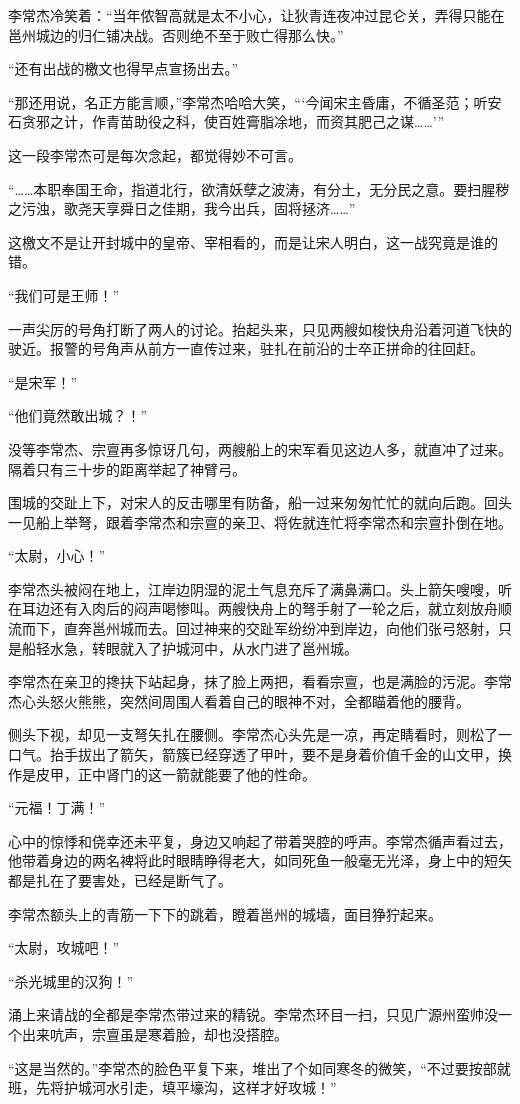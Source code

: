 李常杰冷笑着：“当年侬智高就是太不小心，让狄青连夜冲过昆仑关，弄得只能在邕州城边的归仁铺决战。否则绝不至于败亡得那么快。”

“还有出战的檄文也得早点宣扬出去。”

“那还用说，名正方能言顺，”李常杰哈哈大笑，“‘今闻宋主昏庸，不循圣范；听安石贪邪之计，作青苗助役之科，使百姓膏脂凃地，而资其肥己之谋……’”

这一段李常杰可是每次念起，都觉得妙不可言。

“……本职奉国王命，指道北行，欲清妖孽之波涛，有分土，无分民之意。要扫腥秽之污浊，歌尧天享舜日之佳期，我今出兵，固将拯济……”

这檄文不是让开封城中的皇帝、宰相看的，而是让宋人明白，这一战究竟是谁的错。

“我们可是王师！”

一声尖厉的号角打断了两人的讨论。抬起头来，只见两艘如梭快舟沿着河道飞快的驶近。报警的号角声从前方一直传过来，驻扎在前沿的士卒正拼命的往回赶。

“是宋军！”

“他们竟然敢出城？！”

没等李常杰、宗亶再多惊讶几句，两艘船上的宋军看见这边人多，就直冲了过来。隔着只有三十步的距离举起了神臂弓。

围城的交趾上下，对宋人的反击哪里有防备，船一过来匆匆忙忙的就向后跑。回头一见船上举弩，跟着李常杰和宗亶的亲卫、将佐就连忙将李常杰和宗亶扑倒在地。

“太尉，小心！”

李常杰头被闷在地上，江岸边阴湿的泥土气息充斥了满鼻满口。头上箭矢嗖嗖，听在耳边还有入肉后的闷声喝惨叫。两艘快舟上的弩手射了一轮之后，就立刻放舟顺流而下，直奔邕州城而去。回过神来的交趾军纷纷冲到岸边，向他们张弓怒射，只是船轻水急，转眼就入了护城河中，从水门进了邕州城。

李常杰在亲卫的搀扶下站起身，抹了脸上两把，看看宗亶，也是满脸的污泥。李常杰心头怒火熊熊，突然间周围人看着自己的眼神不对，全都瞄着他的腰背。

侧头下视，却见一支弩矢扎在腰侧。李常杰心头先是一凉，再定睛看时，则松了一口气。抬手拔出了箭矢，箭簇已经穿透了甲叶，要不是身着价值千金的山文甲，换作是皮甲，正中肾门的这一箭就能要了他的性命。

“元福！丁满！”

心中的惊悸和侥幸还未平复，身边又响起了带着哭腔的呼声。李常杰循声看过去，他带着身边的两名裨将此时眼睛睁得老大，如同死鱼一般毫无光泽，身上中的短矢都是扎在了要害处，已经是断气了。

李常杰额头上的青筋一下下的跳着，瞪着邕州的城墙，面目狰狞起来。

“太尉，攻城吧！”

“杀光城里的汉狗！”

涌上来请战的全都是李常杰带过来的精锐。李常杰环目一扫，只见广源州蛮帅没一个出来吭声，宗亶虽是寒着脸，却也没搭腔。

“这是当然的。”李常杰的脸色平复下来，堆出了个如同寒冬的微笑，“不过要按部就班，先将护城河水引走，填平壕沟，这样才好攻城！”


